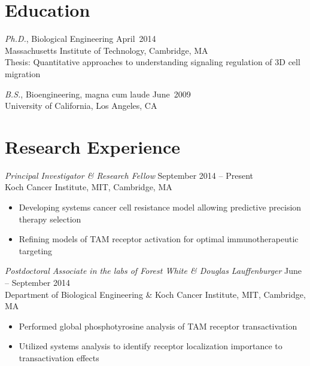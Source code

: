\documentclass[11pt]{res}
\begin{document}

\thispagestyle{firststyle}


\address{aameyer@mit.edu \\ (617) 324-4404 \\ \url{http://asmlab.org} } %

\address{77 Massachusetts Avenue, 76-361F
 \\ Cambridge, MA 02139} %


\begin{resume}

\raggedright 

\section{Education}

{\sl Ph.D.}, 
Biological Engineering  \hfill April~2014\\ 
Massachusetts Institute of Technology, Cambridge, MA \\ 
Thesis: Quantitative approaches to understanding signaling regulation of 3D cell migration
 
{\sl B.S.}, Bioengineering, magna cum laude \hfill June~2009\\ 
University of California, Los Angeles, CA

\section{Research Experience}

{\sl Principal Investigator \& Research Fellow} \hfill September 2014 -- Present \\
Koch Cancer Institute, MIT, Cambridge, MA 
\begin{itemize}
\item Developing systems cancer cell resistance model allowing predictive precision therapy selection
\item Refining models of TAM receptor activation for optimal immunotherapeutic targeting
\end{itemize}

{\sl Postdoctoral Associate in the labs of Forest White \& Douglas Lauffenburger} \hfill June -- September 2014 \\
Department of Biological Engineering \& Koch Cancer Institute, MIT, Cambridge, MA 
\begin{itemize}
\item Performed global phosphotyrosine analysis of TAM receptor transactivation 
\item Utilized systems analysis to identify receptor localization importance to transactivation effects
\end{itemize}
 

\end{resume}
\end{document}
